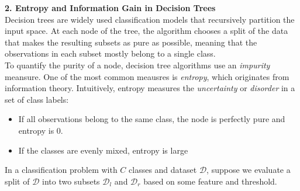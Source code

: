 \documentclass[11pt]{article}
\begin{document}
    \newpage
    \textbf{2. Entropy and Information Gain in Decision Trees} \\ 

    Decision trees are widely used classification models that recursively partition the input space.
    At each node of the tree, the algorithm chooses a split of the data that makes the resulting
    subsets as pure as possible, meaning that the observations in each subset mostly belong to a
    single class. \\ 

    To quantify the purity of a node, decision tree algorithms use an \textit{impurity} meansure.
    One of the most common meausres is \textit{entropy}, which originates from information theory.
    Intuitively, entropy measures the \textit{uncertainty} or \textit{disorder} in a set of class
    labels:

    \begin{itemize}
        \item If all observations belong to the same class, the node is perfectly pure and entropy
            is 0. 
        \item If the classes are evenly mixed, entropy is large
    \end{itemize}

    In a classification problem with $C$ classes and dataset $\mathcal{D}$, suppose we evaluate a
    split of $\mathcal{D}$ into two subsets $\mathcal{D}_l$ and $\mathcal{D}_r$ based on some feature
    and threshold. \\ 
\end{document}
